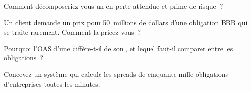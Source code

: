 \begin{interviewq}\label{iq:m2:corporate-bonds:3}
Comment décomposeriez-vous un  en perte attendue et prime de risque~?
\end{interviewq}

\begin{interviewq}\label{iq:m2:corporate-bonds:4}
Un client demande un prix pour 50~millions de dollars d'une obligation BBB qui se traite rarement. Comment
la pricez-vous~?
\end{interviewq}

\begin{interviewq}\label{iq:m2:corporate-bonds:5}
Pourquoi l'OAS d'une  diffère-t-il de son , et lequel
faut-il comparer entre les obligations~?
\end{interviewq}

\begin{interviewq}\label{iq:m2:corporate-bonds:6}
Concevez un système qui calcule les spreads de cinquante mille obligations d'entreprises toutes les minutes.
\end{interviewq}
